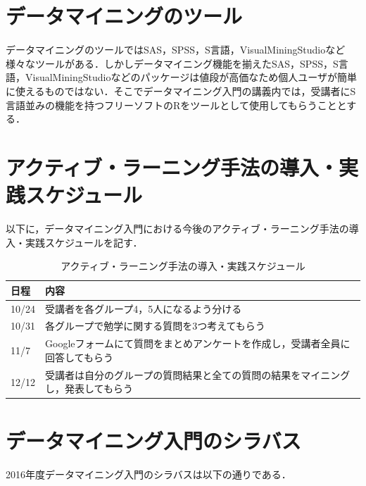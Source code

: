 \newpage

\section{データマイニングのツール}

データマイニングのツールではSAS，SPSS，S言語，VisualMiningStudioなど様々なツールがある．しかしデータマイニング機能を揃えたSAS，SPSS，S言語，VisualMiningStudioなどのパッケージは値段が高価なため個人ユーザが簡単に使えるものではない．そこでデータマイニング入門の講義内では，受講者にS言語並みの機能を持つフリーソフトのRをツールとして使用してもらうこととする．

\section{アクティブ・ラーニング手法の導入・実践スケジュール}

以下に，データマイニング入門における今後のアクティブ・ラーニング手法の導入・実践スケジュールを記す．
\begin{table}[h]
  \begin{center}
    \caption{アクティブ・ラーニング手法の導入・実践スケジュール}
    \begin{tabular}{|l|l|} \hline
      日程 & 内容  \\ \hline
      10/24 & 受講者を各グループ4，5人になるよう分ける  \\
      10/31 & 各グループで勉学に関する質問を3つ考えてもらう  \\
      11/7 & Googleフォームにて質問をまとめアンケートを作成し，受講者全員に回答してもらう  \\
      12/12 & 受講者は自分のグループの質問結果と全ての質問の結果をマイニングし，発表してもらう  \\ \hline
    \end{tabular}
  \end{center}
\end{table}



\section{データマイニング入門のシラバス}
2016年度データマイニング入門のシラバスは以下の通りである．

